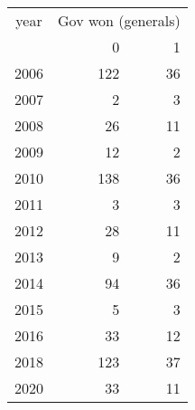 \footnotesize\begin{tabular}[t]{lrr}
\toprule
\multicolumn{1}{c}{year} & \multicolumn{2}{c}{Gov won (generals)} \\
\cmidrule(l{3pt}r{3pt}){1-1} \cmidrule(l{3pt}r{3pt}){2-3}
  & 0 & 1\\
\midrule
2006 & 122 & 36\\
2007 & 2 & 3\\
2008 & 26 & 11\\
2009 & 12 & 2\\
2010 & 138 & 36\\
2011 & 3 & 3\\
2012 & 28 & 11\\
2013 & 9 & 2\\
2014 & 94 & 36\\
2015 & 5 & 3\\
2016 & 33 & 12\\
2018 & 123 & 37\\
2020 & 33 & 11\\
\bottomrule
\end{tabular}
